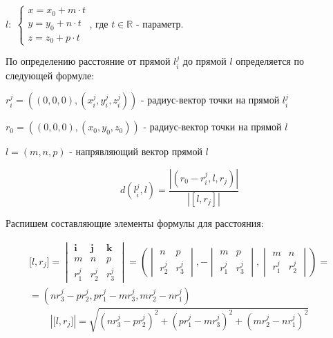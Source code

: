 \begin{center}
	$\mathit{l}: \; \begin{cases}
		x = x_0 + m \cdot t \\
		y = y_0 + n \cdot t \\
		z = z_0 + p \cdot t
	\end{cases}$, где $t \in \mathbb{R}$ - параметр. 
\end{center}

\newpage
По определению расстояние от прямой $l_i^j$ до прямой $\mathit{l}$ определяется по следующей формуле:

$r_i^j = ((0,0,0), (x_i^j, y_i^j, z_i^j))$ - радиус-вектор точки на прямой $l_i^j$

$r_0 = ((0,0,0), (x_0, y_0, z_0))$ - радиус-вектор точки на прямой $\mathit{l}$

$\mathit{l} = (m, n, p)$ - напрявляющий вектор прямой $\mathit{l}$

$$d (l_i^j, \mathit{l}) = \frac{|(r_0 - r_i^j, \mathit{l}, r_j)|}{|[\mathit{l}, r_j]|}$$

Распишем составляющие элементы формулы для расстояния:

$$\begin{gathered}
	\text{[}l, r_j \text{]}= 
		\begin{vmatrix}
			\mathbf{i} & \mathbf{j} & \mathbf{k} \\
			m & n & p \\
			r_1^j & r_2^j & r_3^j
		\end{vmatrix} 
		= 
		\left(
			\begin{vmatrix}
				n & p \\
				r_2^j & r_3^j
			\end{vmatrix}, 
			-\begin{vmatrix}
				m & p \\
				r_1^j & r_3^j
			\end{vmatrix},
			\begin{vmatrix}
				m & n \\
				r_1^j & r_2^j
			\end{vmatrix}
		\right) = \\
		= (n r_3^j - p r_2^j, p r_1^j - m r_3^j, m r_2^j - n r_1^j)
\end{gathered}$$
$$|\text{[}l, r_j \text{]}| = \sqrt{ (n r_3^j - p r_2^j)^2 + (p r_1^j - m r_3^j)^2 + (m r_2^j - n r_1^j)^2}$$

